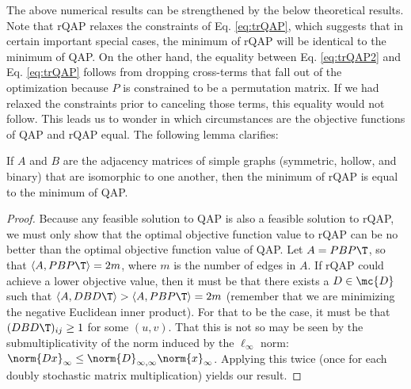 \documentclass[10pt,journal,cspaper,compsoc]{IEEEtran}
\begin{document}
The above numerical results can be strengthened by the below theoretical results.  
Note that rQAP relaxes the constraints of Eq. \eqref{eq:trQAP}, which suggests that in certain important special cases, the minimum of rQAP will be identical to the minimum of QAP. On the other hand, the equality between Eq. \eqref{eq:trQAP2} and Eq. \eqref{eq:trQAP} follows from dropping cross-terms that fall out of the optimization because $P$ is constrained to be a permutation matrix.  If we had relaxed the constraints prior to canceling those terms, this equality would not follow.  This leads us to wonder in which circumstances are the objective functions of QAP and rQAP equal.  The following lemma clarifies:
\begin{lem}
	If $A$ and $B$ are the adjacency matrices of simple graphs (symmetric, hollow, and binary) that are isomorphic to one another, then the minimum of rQAP is equal to the minimum of QAP.
\end{lem}
\begin{proof}
Because any feasible solution to QAP is also a feasible solution to rQAP, we must only show that the optimal objective function value to rQAP can be no better than the optimal objective function value of QAP.  Let $A=PBP\T$, so that $\langle A, PBP\T\rangle=2m$, where $m$ is the number of edges in $A$.  If rQAP could achieve a lower objective value, then it must be that there exists a $D \in \mc{D}$ such that $\langle A, DBD\T\rangle > \langle A, PBP\T\rangle = 2m$ (remember that we are minimizing the negative Euclidean inner product). For that to be the case, it must be that $(DBD\T)_{ij} \geq 1$ for some $(u,v)$.  That this is not so may be seen by the submultiplicativity of the norm induced by the $\ell_{\infty}$ norm:
$\norm{Dx}_\infty \leq \norm{D}_{\infty,\infty} \norm{x}_\infty$.  Applying this twice (once for each doubly stochastic matrix multiplication) yields our result.
\end{proof}



\end{document}
